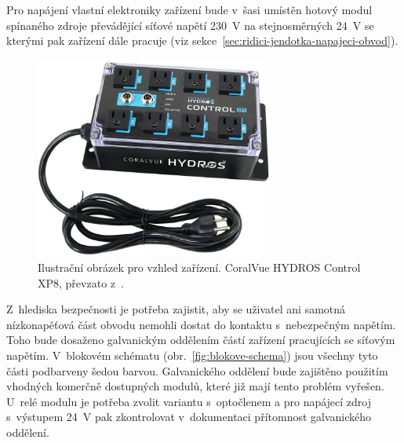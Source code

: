     Pro napájení vlastní elektroniky zařízení bude v~šasi umístěn hotový modul spínaného zdroje převádějící síťové napětí \qty{230}{V} na stejnosměrných \qty{24}{V} se kterými pak zařízení dále pracuje (viz sekce~\ref{sec:ridici-jendotka-napajeci-obvod}).  


    \begin{figure}[h!]
        \centering
        \includegraphics[width=0.7\textwidth]{obrazky/hydros.jpg}
        \caption{Ilustrační obrázek pro vzhled zařízení. CoralVue HYDROS Control XP8, převzato z~\cite{coralvuehydros}. }
        \label{fig:obrazky-hydros-control}
    \end{figure}

    
    
    Z~hlediska bezpečnosti je potřeba zajistit, aby se uživatel ani samotná nízkonapěťová část obvodu nemohli dostat do kontaktu s~nebezpečným napětím. Toho bude dosaženo galvanickým oddělením částí zařízení pracujících se síťovým napětím. V~blokovém schématu (obr.~\ref{fig:blokove-schema}) jsou všechny tyto části podbarveny šedou barvou. Galvanického oddělení bude zajištěno použitím vhodných komerčně dostupných modulů, které již mají tento problém vyřešen. U~relé modulu je potřeba zvolit variantu s~optočlenem a pro napájecí zdroj s~výstupem \qty{24}{V} pak zkontrolovat v~dokumentaci přítomnost galvanického oddělení. 
    


    
    

